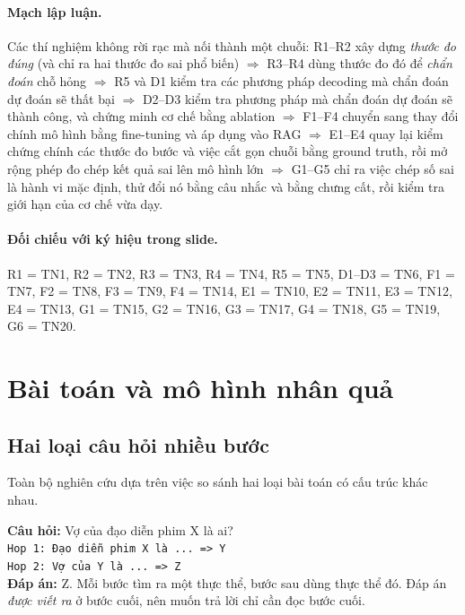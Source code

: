 \documentclass[11pt]{article}
\begin{document}
\paragraph{Mạch lập luận.} Các thí nghiệm không rời rạc mà nối thành một chuỗi:
R1--R2 xây dựng \emph{thước đo đúng} (và chỉ ra hai thước đo sai phổ biến) $\Rightarrow$
R3--R4 dùng thước đo đó để \emph{chẩn đoán} chỗ hỏng $\Rightarrow$
R5 và D1 kiểm tra các phương pháp decoding mà chẩn đoán dự đoán sẽ thất bại $\Rightarrow$
D2--D3 kiểm tra phương pháp mà chẩn đoán dự đoán sẽ thành công, và chứng minh cơ chế bằng ablation $\Rightarrow$
F1--F4 chuyển sang thay đổi chính mô hình bằng fine-tuning và áp dụng vào RAG $\Rightarrow$
E1--E4 quay lại kiểm chứng chính các thước đo bước và việc cắt gọn chuỗi bằng ground truth, rồi mở rộng
phép đo chép kết quả sai lên mô hình lớn $\Rightarrow$
G1--G5 chỉ ra việc chép số sai là hành vi mặc định, thử đổi nó bằng câu nhắc và bằng chưng cất, rồi kiểm tra
giới hạn của cơ chế vừa dạy.

\paragraph{Đối chiếu với ký hiệu trong slide.} R1 = TN1, R2 = TN2, R3 = TN3, R4 = TN4, R5 = TN5, D1--D3 =
TN6, F1 = TN7, F2 = TN8, F3 = TN9, F4 = TN14, E1 = TN10, E2 = TN11, E3 = TN12, E4 = TN13, G1 = TN15, G2 = TN16, G3 = TN17, G4 = TN18, G5 = TN19, G6 = TN20.

\section{Bài toán và mô hình nhân quả}

\subsection{Hai loại câu hỏi nhiều bước}

Toàn bộ nghiên cứu dựa trên việc so sánh hai loại bài toán có cấu trúc khác nhau.

\begin{vidu}
\textbf{Câu hỏi:} Vợ của đạo diễn phim X là ai?\\
\texttt{Hop 1: Đạo diễn phim X là ... => Y}\\
\texttt{Hop 2: Vợ của Y là ... => Z}\\
\textbf{Đáp án:} Z. Mỗi bước tìm ra một thực thể, bước sau dùng thực thể đó. Đáp án \emph{được
viết ra} ở bước cuối, nên muốn trả lời chỉ cần đọc bước cuối.
\end{vidu}
\end{document}
